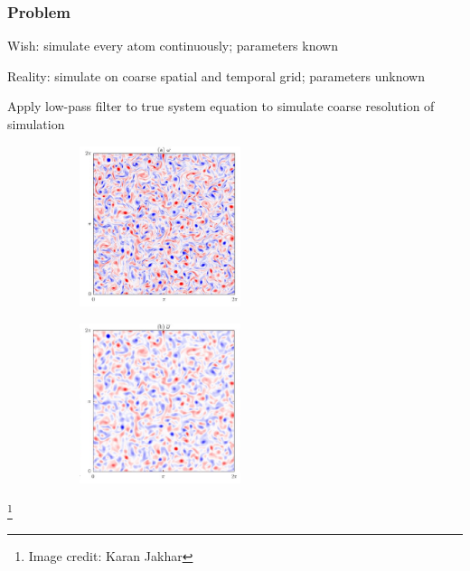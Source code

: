 \documentclass{beamer}
\newcommand\blfootnote[1]{%
  \begingroup
  \renewcommand\thefootnote{}\footnote{#1}%
  \addtocounter{footnote}{-1}%
  \endgroup
}
\begin{document}
\begin{frame}
  \frametitle{Problem}
  Wish: simulate every atom continuously; parameters known
  \pause

  Reality: simulate on coarse spatial and temporal grid; parameters unknown
  \newline
  \pause

  Apply low-pass filter to true system equation to simulate coarse resolution
  of simulation

  \begin{figure}
    \centering
    \begin{subfigure}{0.45\textwidth}
      \centering
      \includegraphics[height=1.85in, keepaspectratio]{karan1.pdf}
    \end{subfigure}
    \begin{subfigure}{0.45\textwidth}
      \centering
      \includegraphics[height=1.85in, keepaspectratio]{karan2.pdf}
    \end{subfigure}
  \end{figure}
  \blfootnote{Image credit: Karan Jakhar}
\end{frame}
\end{document}
